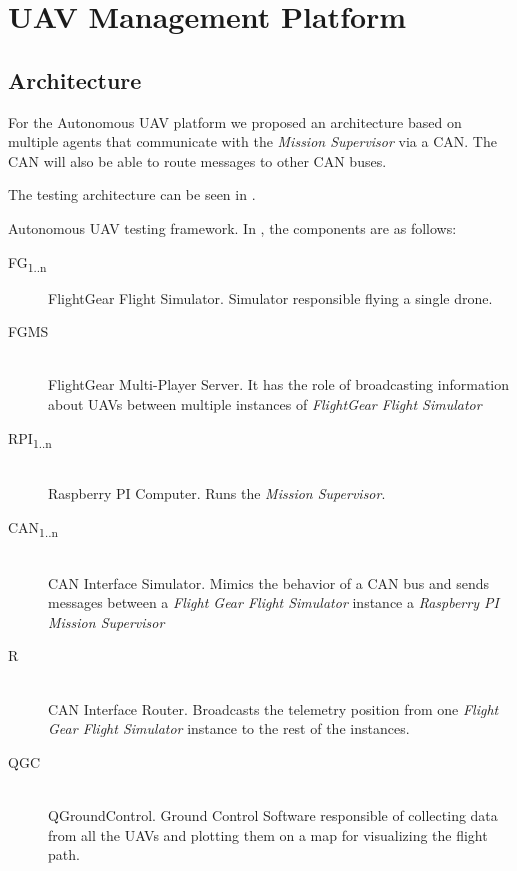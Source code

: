 \chapter{UAV Management Platform}
\label{chapter:uav-management-framework}

\section{Architecture}
\label{sec:architecture}
For the Autonomous UAV platform we proposed an architecture based on multiple
agents that communicate with the \textit{Mission Supervisor} via a CAN.
The CAN will also be able to route messages
to other CAN buses. 

The testing architecture can be seen in  .

{Autonomous UAV testing framework.}
\newpage
In , the components are as
follows:
\begin{description}
\item [FG\textsubscript{1..n}] FlightGear Flight Simulator. Simulator responsible
flying a single drone.
\item [FGMS] \hfill \\ FlightGear Multi-Player Server. It has the role of broadcasting
information about UAVs between multiple instances of \textit{FlightGear Flight Simulator}
\item [RPI\textsubscript{1..n}] \hfill \\Raspberry PI Computer. Runs the \textit{Mission Supervisor}.
\item [CAN\textsubscript{1..n}] \hfill \\ CAN Interface Simulator. Mimics the behavior of 
a CAN bus and sends messages between a \textit{Flight Gear Flight Simulator} 
instance a \textit{Raspberry PI Mission Supervisor}
\item [R] \hfill \\ CAN Interface Router. Broadcasts the telemetry position from one
\textit{Flight Gear Flight Simulator} instance to the rest of the instances.
\item [QGC] \hfill \\ QGroundControl. Ground Control Software responsible of collecting data
from all the UAVs and plotting them on a map for visualizing the flight path.
\end{description}


